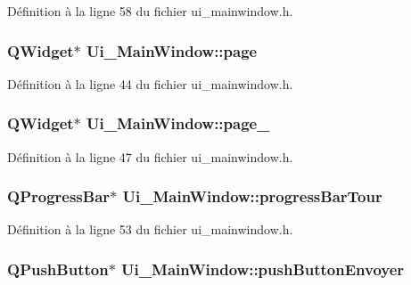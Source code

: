Définition à la ligne 58 du fichier ui\-\_\-mainwindow.\-h.

\hypertarget{class_ui___main_window_ad7d164376bef8649ee1f94697b859417}{
\subsubsection[{page}]{\setlength{\rightskip}{0pt plus 5cm}Q\-Widget$\ast$ Ui\-\_\-\-Main\-Window\-::page}}\label{class_ui___main_window_ad7d164376bef8649ee1f94697b859417}


Définition à la ligne 44 du fichier ui\-\_\-mainwindow.\-h.

\hypertarget{class_ui___main_window_adcb6de4cebc6760fe319711f125010cc}{
\subsubsection[{page\-\_\-2}]{\setlength{\rightskip}{0pt plus 5cm}Q\-Widget$\ast$ Ui\-\_\-\-Main\-Window\-::page\-\_}}\label{class_ui___main_window_adcb6de4cebc6760fe319711f125010cc}


Définition à la ligne 47 du fichier ui\-\_\-mainwindow.\-h.

\hypertarget{class_ui___main_window_a5731ca480b84d22f9c8e94027e86e0c2}{
\subsubsection[{progress\-Bar\-Tour}]{\setlength{\rightskip}{0pt plus 5cm}Q\-Progress\-Bar$\ast$ Ui\-\_\-\-Main\-Window\-::progress\-Bar\-Tour}}\label{class_ui___main_window_a5731ca480b84d22f9c8e94027e86e0c2}


Définition à la ligne 53 du fichier ui\-\_\-mainwindow.\-h.

\hypertarget{class_ui___main_window_a072e96de598f1a463755290fa185849a}{
\subsubsection[{push\-Button\-Envoyer}]{\setlength{\rightskip}{0pt plus 5cm}Q\-Push\-Button$\ast$ Ui\-\_\-\-Main\-Window\-::push\-Button\-Envoyer}}\label{class_ui___main_window_a072e96de598f1a463755290fa185849a}


